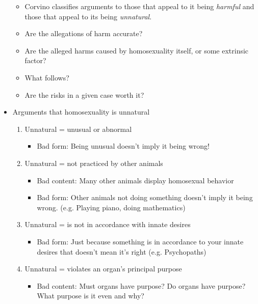 \documentclass{article}
\begin{document}
\begin{spacing}{1.2}
\begin{itemize}
              \begin{itemize}
                  \item Corvino classifies arguments to those that appeal to it being \emph{harmful} and those that appeal to its being \emph{unnatural}.
                  \item Are the allegations of harm accurate?
                  \item Are the alleged harms caused by homosexuality itself, or some extrinsic factor?
                  \item What follows?
                  \item Are the risks in a given case worth it?
              \end{itemize}
        \item Arguments that homosexuality is unnatural
              \begin{enumerate}
                  \item Unnatural = unusual or abnormal
                        \begin{itemize}
                            \item Bad form: Being unusual doesn't imply it being wrong!
                        \end{itemize}
                  \item Unnatural = not practiced by other animals
                        \begin{itemize}
                            \item Bad content: Many other animals display homosexual behavior
                            \item Bad form: Other animals not doing something doesn't imply it being wrong. (e.g. Playing piano, doing mathematics)
                        \end{itemize}
                  \item Unnatural = is not in accordance with innate desires
                        \begin{itemize}
                            \item Bad form: Just because something is in accordance to your innate desires that doesn't mean it's right (e.g. Psychopaths)
                        \end{itemize}
                  \item Unnatural = violates an organ's principal purpose
                        \begin{itemize}
                            \item Bad content: Must organs have purpose? Do organs have purpose? What purpose is it even and why?

\end{itemize}
\end{enumerate}
\end{itemize}
\end{spacing}
\end{document}
